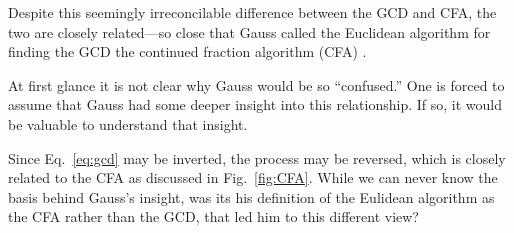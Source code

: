 \documentclass{ximera}
\begin{document}
Despite this seemingly irreconcilable difference between the GCD and CFA, the two are closely related---so 
close that Gauss called the Euclidean algorithm for finding the GCD the continued fraction algorithm
(CFA) \citep[p.~48]{JS10}.

At first glance it is not clear why Gauss would be so ``confused.''  One is forced to assume that Gauss
had some deeper insight into this relationship.  If so, it would be valuable to understand that insight.

Since Eq.~\ref{eq:gcd} may be inverted, the process may be reversed, which is closely related to the 
CFA as discussed in Fig.~\ref{fig:CFA}. 
While we can never know the basis behind Gauss's insight, was its his definition of the Eulidean algorithm as the CFA rather than the GCD, that led him to this different view?
\end{document}
